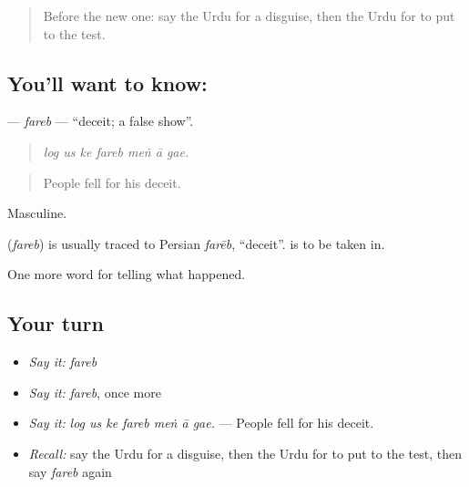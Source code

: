 \label{lesson:UR-C328-fareb}



\begin{quote}
Before the new one: say the Urdu for a disguise, then the Urdu for to put to the test.
\end{quote}

\subsection*{You'll want to know: }
\textbf{} — \emph{fareb} — \textquotedblleft{}deceit; a false show\textquotedblright{}.

\begin{quote}
      
\end{quote}

\begin{quote}
\emph{log us ke fareb meṅ ā gae.}
\end{quote}

\begin{quote}
People fell for his deceit.
\end{quote}

Masculine.

\begin{cousinweb}
\textbf{} (\emph{fareb}) is usually traced to Persian \emph{farēb}, \textquotedblleft{}deceit\textquotedblright{}. \textbf{  } is to be taken in.
\end{cousinweb}

\begin{grammarlens}[title={What you've built}]
One more word for telling what happened.
\end{grammarlens}

\subsection*{Your turn}
\begin{itemize}
\raggedright
  \item \emph{Say it:} \emph{fareb}
  \item \emph{Say it:} \emph{fareb}, once more
  \item \emph{Say it:} \emph{log us ke fareb meṅ ā gae.} — People fell for his deceit.
  \item \emph{Recall:} say the Urdu for a disguise, then the Urdu for to put to the test, then say \emph{fareb} again
\end{itemize}

